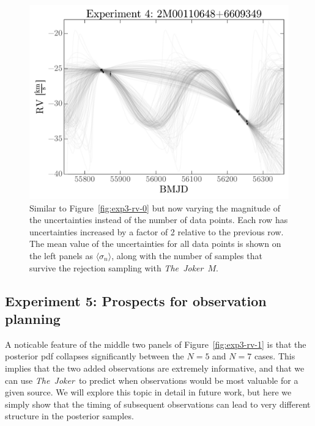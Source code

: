 \documentclass[manuscript, letterpaper]{aastex6}
\newcommand{\project}[1]{\textsl{#1}}
\newcommand{\samplername}{\project{The~Joker}}
\newcommand{\figname}{Figure}
\begin{document}
\begin{figure}[p]
\begin{center}
\includegraphics[width=\textwidth]{figures/exp4-rv-curves.pdf}
\end{center}
\caption{%
Similar to \figname~\ref{fig:exp3-rv-0} but now varying the magnitude of the
uncertainties instead of the number of data points.
Each row has uncertainties increased by a factor of 2 relative to the previous
row.
The mean value of the uncertainties for all data points is shown on the left
panels as $\langle \sigma_n \rangle$, along with the number of samples that
survive the rejection sampling with \samplername\, $M$.
\label{fig:exp4-rv}}
\end{figure}

\subsection{Experiment 5: Prospects for observation planning}

A noticable feature of the middle two panels of \figname~\ref{fig:exp3-rv-1} is
that the posterior pdf collapses significantly between the $N=5$ and $N=7$
cases.
This implies that the two added observations are extremely informative, and that
we can use \samplername\ to predict when observations would be most valuable for
a given source.
We will explore this topic in detail in future work, but here we simply show
that the timing of subsequent observations can lead to very different
structure in the posterior samples.
\end{document}
